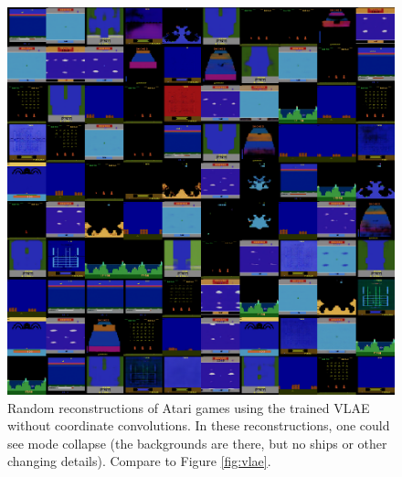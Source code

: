 \documentclass{article}
\begin{document}
\begin{figure}
  \includegraphics[width=0.8\linewidth]{epoch287.png}
  \caption{Random reconstructions of Atari games using the trained VLAE without coordinate convolutions. In these reconstructions, one could see mode collapse (the backgrounds are there, but no ships or other changing details). Compare to Figure \ref{fig:vlae}.}
  \label{fig:vlae-cordconv}
\end{figure}
\end{document}
